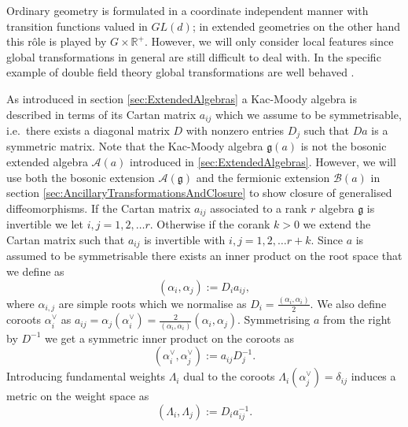 Ordinary geometry is formulated in a coordinate independent manner with transition functions valued in $GL(d)$; in extended geometries on the other hand this rôle is played by $G\times\mathbb{R}^+$. However, we will only consider local features since global transformations in general are still difficult to deal with. In the specific example of double field theory global transformations are well behaved \cite{Hohm:2012gk,Berman:2014jba}.

As introduced in section \ref{sec:ExtendedAlgebras} a Kac-Moody algebra is described in terms of its Cartan matrix $a_{ij}$ which we assume to be symmetrisable, i.e.\ there exists a diagonal matrix $D$ with nonzero entries $D_j$ such that $Da$ is a symmetric matrix. Note that the Kac-Moody algebra $\mathfrak{g}(a)$ is not the bosonic extended algebra $\mathscr{A}(a)$ introduced in \ref{sec:ExtendedAlgebras}. However, we will use both the bosonic extension $\mathscr{A}(\mathfrak{g})$ and the fermionic extension $\mathscr{B}(a)$ in section \ref{sec:AncillaryTransformationsAndClosure} to show closure of generalised diffeomorphisms. If the Cartan matrix $a_{ij}$ associated to a rank $r$ algebra $\mathfrak{g}$ is invertible we let $i,j=1,2,\ldots r$. Otherwise if the corank $k>0$ we extend the Cartan matrix such that $a_{ij}$ is invertible with $i,j=1,2,\ldots r+k$. Since $a$ is assumed to be symmetrisable there exists an inner product on the root space that we define as 
\begin{equation}
    (\alpha_i,\alpha_j) := D_ia_{ij},
\end{equation}
where $\alpha_{i,j}$ are simple roots which we normalise as $D_i=\frac{(\alpha_i,\alpha_i)}{2}$. We also define coroots $\alpha_i^\vee$ as $a_{ij} =\alpha_j(\alpha_i^\vee) = \frac{2}{(\alpha_i,\alpha_i)}(\alpha_i,\alpha_j)$. Symmetrising $a$ from the right by $D^{-1}$ we get a symmetric inner product on the coroots as 
\begin{equation}
    (\alpha_i^\vee,\alpha_j^\vee) := a_{ij}D^{-1}_j. 
\end{equation}
Introducing fundamental weights $\Lambda_i$ dual to the coroots $\Lambda_i(\alpha_j^\vee)=\delta_{ij}$ induces a metric on the weight space as 
\begin{equation}
    (\Lambda_i,\Lambda_j) := D_ia^{-1}_{ij}.
\end{equation}


